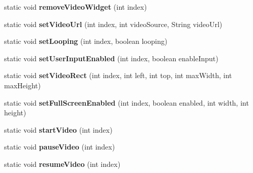 \begin{DoxyCompactItemize}
static void {\bfseries remove\+Video\+Widget} (int index)
\item 
\mbox{\label{classorg_1_1cocos2dx_1_1lib_1_1Cocos2dxVideoHelper_a2f67d3f75f4e9b4a6c13686a8aa047d3}} 
static void {\bfseries set\+Video\+Url} (int index, int video\+Source, String video\+Url)
\item 
\mbox{\label{classorg_1_1cocos2dx_1_1lib_1_1Cocos2dxVideoHelper_a4450fa940611b4ad819568d290033e99}} 
static void {\bfseries set\+Looping} (int index, boolean looping)
\item 
\mbox{\label{classorg_1_1cocos2dx_1_1lib_1_1Cocos2dxVideoHelper_ac8da6144014610caa76f532dd92175a9}} 
static void {\bfseries set\+User\+Input\+Enabled} (int index, boolean enable\+Input)
\item 
\mbox{\label{classorg_1_1cocos2dx_1_1lib_1_1Cocos2dxVideoHelper_af1f59a3f73ec95a9d7f902abda664e14}} 
static void {\bfseries set\+Video\+Rect} (int index, int left, int top, int max\+Width, int max\+Height)
\item 
\mbox{\label{classorg_1_1cocos2dx_1_1lib_1_1Cocos2dxVideoHelper_a50acfd49e5a270fbcd1ed39f7057ecac}} 
static void {\bfseries set\+Full\+Screen\+Enabled} (int index, boolean enabled, int width, int height)
\item 
\mbox{\label{classorg_1_1cocos2dx_1_1lib_1_1Cocos2dxVideoHelper_aab270b59e54b8f53d2bbe7c7a9f43352}} 
static void {\bfseries start\+Video} (int index)
\item 
\mbox{\label{classorg_1_1cocos2dx_1_1lib_1_1Cocos2dxVideoHelper_a7114144479eedf050d28de603883b21a}} 
static void {\bfseries pause\+Video} (int index)
\item 
\mbox{\label{classorg_1_1cocos2dx_1_1lib_1_1Cocos2dxVideoHelper_a5c5ef11f4d94caf26eb3a773cd4fcdd5}} 
static void {\bfseries resume\+Video} (int index)

\end{DoxyCompactItemize}
